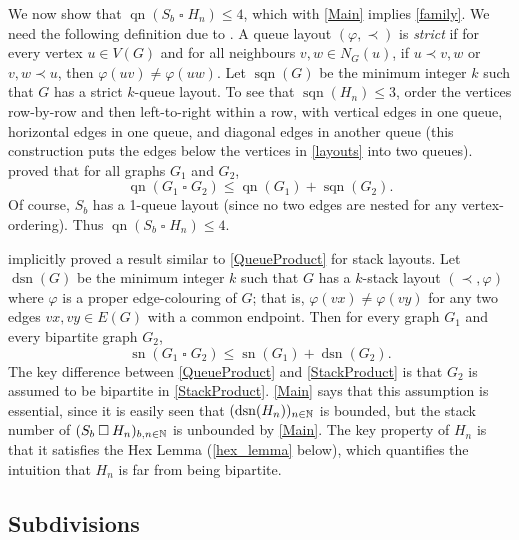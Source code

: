 \documentclass[kpfonts]{patmorin}
\DeclareMathOperator{\sn}{sn}
\DeclareMathOperator{\qn}{qn}
\DeclareMathOperator{\sqn}{sqn}
\DeclareMathOperator{\dsn}{dsn}
\renewcommand{\leq}{\leqslant}
\newcommand{\CartProd}{\mathbin{\square}}
\begin{document}
We now show that $\qn(S_b\CartProd H_n)\leq 4$, which with \cref{Main} implies \cref{family}. We need the following definition due to \citet{Wood-Queue-DMTCS05}. A queue layout $(\varphi,\prec)$ is \emph{strict} if for every vertex $u\in V(G)$ and for all neighbours $v,w\in N_G(u)$, if $u\prec v,w$ or $v,w \prec u$, then $\varphi(uv)\neq \varphi(uw)$. Let $\sqn(G)$ be the minimum integer $k$ such that $G$ has a strict $k$-queue layout. To see that $\sqn(H_n) \leq 3$, order the vertices row-by-row and then left-to-right within a row, with vertical edges in one queue, horizontal edges in one queue, and diagonal edges in another queue (this construction puts the edges below the vertices in \cref{layouts} into two queues). \citet{Wood-Queue-DMTCS05} proved that for all graphs $G_1$ and $G_2$,
\begin{equation}
\label{QueueProduct}
\qn(G_1 \CartProd G_2) \leq \qn(G_1) + \sqn(G_2).
\end{equation}
Of course, $S_b$ has a 1-queue layout (since no two edges are nested for any vertex-ordering). Thus $\qn(S_b \CartProd H_n)\leq 4$.

\citet{BK79} implicitly proved a result similar to \cref{QueueProduct} for stack layouts. Let $\dsn(G)$ be the minimum integer $k$ such that $G$ has a $k$-stack layout $(\prec,\varphi)$ where $\varphi$ is a proper edge-colouring of $G$; that is, $\varphi(vx)\neq\varphi(vy)$ for any two edges $vx,vy\in E(G)$ with a common endpoint. Then for every graph $G_1$ and every bipartite graph $G_2$,
\begin{equation}
\label{StackProduct}
\sn(G_1 \CartProd G_2) \leq \sn(G_1) + \dsn(G_2).
\end{equation}
The key difference between \cref{QueueProduct} and \cref{StackProduct} is that $G_2$ is assumed to be bipartite in \cref{StackProduct}. \cref{Main} says that this assumption is essential, since it is easily seen that $(\dsn(H_n))_{n\in\N}$ is bounded, but the stack number of $(S_b \CartProd H_n)_{b,n\in\N}$ is unbounded by \cref{Main}. The key property of $H_n$ is that it satisfies the Hex Lemma (\cref{hex_lemma} below), which quantifies the intuition that $H_n$ is far from being bipartite. 


\subsection*{Subdivisions}
\end{document}
